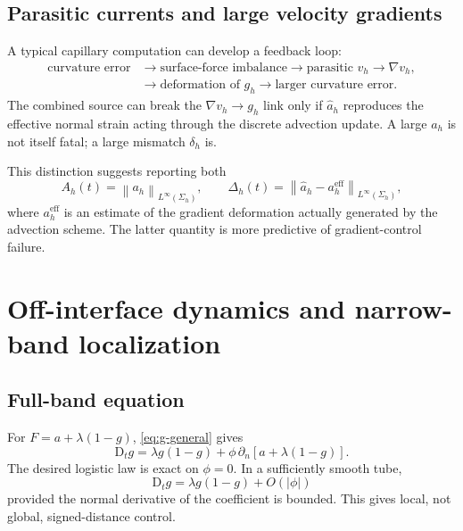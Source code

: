 \documentclass[11pt,a4paper]{article}
\theoremstyle{definition}
\theoremstyle{remark}
\newcommand{\norm}[1]{\left\lVert #1\right\rVert}
\newcommand{\abs}[1]{\left\lvert #1\right\rvert}
\newcommand{\material}{\mathrm{D}_t}
\begin{document}
\subsection{Parasitic currents and large velocity gradients}

A typical capillary computation can develop a feedback loop:
\begin{equation}
  \begin{aligned}
  \text{curvature error}
  &\longrightarrow \text{surface-force imbalance}
  \longrightarrow \text{parasitic }v_h\longrightarrow \nabla v_h,\\
  &\longrightarrow \text{deformation of }g_h
  \longrightarrow \text{larger curvature error}.
  \end{aligned}
\end{equation}
The combined source can break the $\nabla v_h\to g_h$ link only if $\widehat a_h$ reproduces the effective normal strain acting through the discrete advection update. A large $a_h$ is not itself fatal; a large mismatch $\delta_h$ is.

This distinction suggests reporting both
\begin{equation}
  A_h(t)=\norm{a_h}_{L^\infty(\Sigma_h)},
  \qquad
  \Delta_h(t)=\norm{\widehat a_h-a_h^{\mathrm{eff}}}_{L^\infty(\Sigma_h)},
  \label{eq:diagnostic-strains}
\end{equation}
where $a_h^{\mathrm{eff}}$ is an estimate of the gradient deformation actually generated by the advection scheme. The latter quantity is more predictive of gradient-control failure.

\section{Off-interface dynamics and narrow-band localization}

\subsection{Full-band equation}

For $F=a+\lambda(1-g)$, \eqref{eq:g-general} gives
\begin{equation}
  \material g
  =\lambda g(1-g)+\phi\,\partial_n\left[a+\lambda(1-g)\right].
  \label{eq:off-interface-combined}
\end{equation}
The desired logistic law is exact on $\phi=0$. In a sufficiently smooth tube,
\begin{equation}
  \material g=\lambda g(1-g)+O(\abs\phi)
  \label{eq:off-interface-Ophi}
\end{equation}
provided the normal derivative of the coefficient is bounded. This gives local, not global, signed-distance control.
\end{document}
